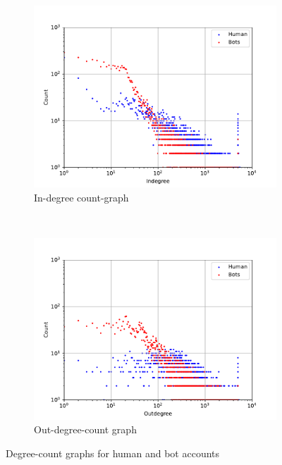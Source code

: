 \begin{figure}[t!]
    \centering
    \begin{subfigure}[t]{0.5\textwidth}
        \centering
        \includegraphics[width=\textwidth]{FIG/indegrees.pdf}
        \caption{In-degree count-graph}
    \end{subfigure}%
    ~
    \begin{subfigure}[t]{0.5\textwidth}
        \centering
        \includegraphics[width=\textwidth]{FIG/outdegrees.pdf}
        \caption{Out-degree-count graph}
    \end{subfigure}
    \caption{Degree-count graphs for human and bot accounts}
    \label{fig:degrees}
\end{figure}

